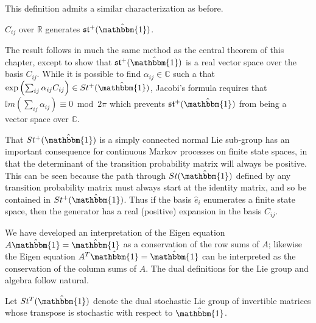 This definition admits a similar characterization as before.

\begin{corollary}
	$C_{ij}$ over $\mathbb{R}$ generates $\mathfrak{st}^{+}(\hat{\mathbbm{1}})$.
\end{corollary}

\begin{IEEEproof}
	The result follows in much the same method as the central theorem of this 
	chapter, except to show that $\mathfrak{st}^{+}(\hat{\mathbbm{1}})$ is a real
	vector space over the basis $C_{ij}$. While it is possible to find $\alpha_{ij} \in \mathbb{C}$ 
	such a that $\exp\left(\sum_{ij} \alpha_{ij} C_{ij}\right) \in St^{+}(\hat{\mathbbm{1}})$,
	Jacobi's formula requires that $\mathbb{I}m\left(\sum_{ij} \alpha_{ij}\right) \equiv 0 \bmod 2 \pi$
	which prevents $\mathfrak{st}^{+}(\hat{\mathbbm{1}})$ from being a vector 
	space over $\mathbb{C}$.\hfill\IEEEQEDhere
\end{IEEEproof}

That $St^{+}(\hat{\mathbbm{1}})$ is a simply connected normal Lie sub-group has 
an important consequence for continuous Markov processes on finite  state 
spaces, in that the determinant of the transition probability matrix will always 
be positive. This can be seen because the path through $St(\hat{\mathbbm{1}})$ 
defined by any transition probability matrix must always start at the identity 
matrix, and so be contained in $St^{+}(\hat{\mathbbm{1}})$. Thus if the basis $\hat{e}_i$
enumerates a finite state space, then the generator has a real (positive) 
expansion in the basis $C_{ij}$.


We have developed an interpretation of the Eigen equation $A \hat{\mathbbm{1}} = \hat{\mathbbm{1}}$
as a conservation of the row sums of $A$; likewise the Eigen equation $A^T \hat{\mathbbm{1}} = \hat{\mathbbm{1}}$
can be interpreted as the conservation of the column sums of $A$. The dual 
definitions for the Lie group and algebra follow natural.

\begin{definition}
	Let $St^T(\hat{\mathbbm{1}})$ denote the dual stochastic Lie group of 
	invertible matrices whose transpose is stochastic with respect to $\hat{\mathbbm{1}}$.
\end{definition}

